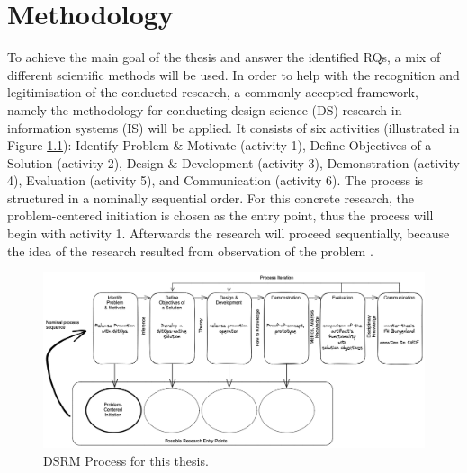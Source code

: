 \chapter{Methodology}



To achieve the main goal of the thesis and answer the identified RQs,
a mix of different scientific methods will be used.
In order to help with the recognition and legitimisation of the conducted research,
a commonly accepted framework, namely
the methodology for conducting design science (DS) research
in information systems (IS)
\autocite{designScienceResearchMethodologyForInformationSystemsResearch}
will be applied.
It consists of six activities
(illustrated in Figure \ref{fig:dsrmProcessReleasePromotionGitOps}):
Identify Problem \& Motivate (activity 1),
Define Objectives of a Solution (activity 2),
Design \& Development (activity 3),
Demonstration (activity 4),
Evaluation (activity 5),
and
Communication (activity 6).
The process is structured in a nominally sequential order.
For this concrete research,
the problem-centered initiation is chosen as the entry point,
thus the process will begin with activity 1.
Afterwards the research will proceed sequentially,
because the idea of the research resulted from observation of the problem
\autocite{designScienceResearchMethodologyForInformationSystemsResearch}.
\bigskip

\begin{figure}[h]
	\centering
	\includegraphics[width=1.00\linewidth]{figures/dsrm-process-release-promotion-gitops.png}
	\caption{DSRM Process for this thesis.
	}
	\label{fig:dsrmProcessReleasePromotionGitOps}	
\end{figure}

